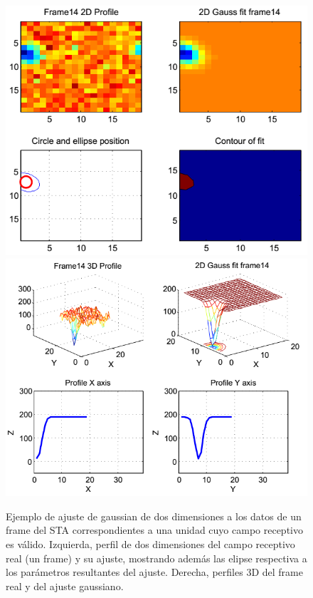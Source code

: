 \documentclass[10pt]{article}
\begin{document}
\begin{center}
\begin{figure}[h!]
\centering
\includegraphics[scale=0.4, natwidth=640, natheight=480]{profile2d_2.png} 	%
\includegraphics[scale=0.4, natwidth=640, natheight=480]{profile3d_2.png}	%
\caption{ Ejemplo de ajuste de gaussian de dos dimensiones a los datos de un frame del STA correspondientes a una unidad cuyo campo receptivo es válido. Izquierda, perfil de dos dimensiones del campo receptivo real (un frame) y su ajuste, mostrando además las elipse respectiva a los parámetros resultantes del ajuste. Derecha, perfiles 3D del frame real y del ajuste gaussiano. }
\label{fig:perfiles1}
\end{figure}
\end{center}
\end{document}
